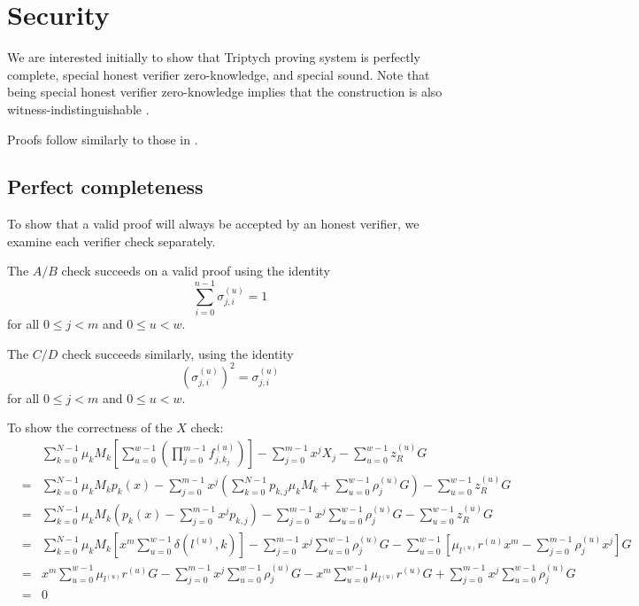\documentclass[draft]{article}
\newcommand{\sumi}{\sum_{i=0}^{n-1}}
\newcommand{\sumj}{\sum_{j=0}^{m-1}}
\newcommand{\sumk}{\sum_{k=0}^{N-1}}
\newcommand{\sumu}{\sum_{u=0}^{w-1}}
\begin{document}
\section{Security}
We are interested initially to show that Triptych proving system is perfectly complete, special honest verifier zero-knowledge, and special sound.
Note that being special honest verifier zero-knowledge implies that the construction is also witness-indistinguishable \cite{cramer}.

Proofs follow similarly to those in \cite{bootle}.


\subsection{Perfect completeness}
To show that a valid proof will always be accepted by an honest verifier, we examine each verifier check separately.

The $A/B$ check succeeds on a valid proof using the identity $$\sumi \sigma^{(u)}_{j,i} = 1$$ for all $0 \leq j < m$ and $0 \leq u < w$.

The $C/D$ check succeeds similarly, using the identity $$\left(\sigma^{(u)}_{j,i}\right)^2 = \sigma^{(u)}_{j,i}$$ for all $0 \leq j < m$ and $0 \leq u < w$.

To show the correctness of the $X$ check:
\begin{eqnarray*}
&& \sumk \mu_kM_k \left[ \sumu \left( \prod_{j=0}^{m-1} f^{(u)}_{j,k_j} \right) \right] - \sumj x^jX_j - \sumu z^{(u)}_RG \\
&=& \sumk \mu_kM_k p_k(x) - \sumj x^j \left( \sumk p_{k,j}\mu_kM_k + \sumu \rho^{(u)}_jG \right) - \sumu z^{(u)}_RG \\
&=& \sumk \mu_kM_k \left( p_k(x) - \sumj x^j p_{k,j} \right) - \sumj x^j \sumu \rho^{(u)}_jG - \sumu z^{(u)}_RG \\
&=& \sumk \mu_kM_k \left[ x^m \sumu \delta\left( l^{(u)},k \right) \right] - \sumj x^j \sumu \rho^{(u)}_jG - \sumu\left[ \mu_{l^{(u)}}r^{(u)}x^m - \sumj \rho^{(u)}_jx^j \right]G \\
&=& x^m\sumu \mu_{l^{(u)}}r^{(u)}G - \sumj x^j \sumu \rho^{(u)}_jG - x^m\sumu \mu_{l^{(u)}}r^{(u)}G + \sumj x^j \sumu \rho^{(u)}_jG \\
&=& 0
\end{eqnarray*}
\end{document}
